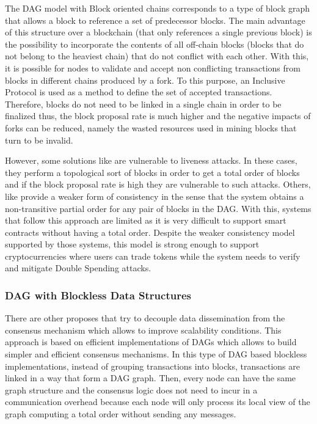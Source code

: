 The \gls{DAG} model with Block oriented chains corresponds to a type of block graph that allows a block to reference a set of predecessor blocks. The main advantage of this structure over a blockchain (that only references a single previous block) is the possibility to incorporate the contents of all off-chain blocks (blocks that do not belong to the heaviest chain) that do not conflict with each other. With this, it is possible for nodes to validate and accept non conflicting transactions from blocks in different chains produced by a fork. To this purpose, an Inclusive Protocol is used as a method to define the set of accepted transactions. Therefore, blocks do not need to be linked in a single chain in order to be finalized thus, the block proposal rate is much higher and the negative impacts of forks can be reduced, namely the wasted resources used in mining blocks that turn to be invalid.

However, some solutions like \cite{block_dag, phantom_dag} are vulnerable to liveness attacks. In these cases, they perform a topological sort of blocks in order to get a total order of blocks and if the block proposal rate is high they are vulnerable to such attacks. Others, like \cite{spectre_dag} provide a weaker form of consistency in the sense that the system obtains a non-transitive partial order for any pair of blocks in the \gls{DAG}. With this, systems that follow this approach are limited as it is very difficult to support smart contracts without having a total order. Despite the weaker consistency model supported by those systems, this model is strong enough to support cryptocurrencies where users can trade tokens while the system needs to verify and mitigate Double Spending attacks.

\subsubsection{DAG with Blockless Data Structures}

There are other proposes \cite{aleph, hashgraph} that try to decouple data dissemination from the consensus mechanism which allows to improve scalability conditions. This approach is based on efficient implementations of \gls{DAG}s which allows to build simpler and efficient consensus mechanisms. In this type of \gls{DAG} based blockless implementations, instead of grouping transactions into blocks, transactions are linked in a way that form a \gls{DAG} graph. Then, every node can have the same graph structure and the consensus logic does not need to incur in a communication overhead because each node will only process its local view of the graph computing a total order without sending any messages.



